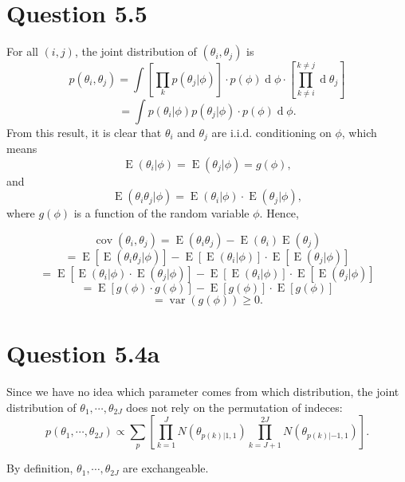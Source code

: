 \documentclass{article}
\DeclareMathOperator*{\var}{var}
\DeclareMathOperator*{\cov}{cov}
\DeclareMathOperator*{\expec}{E}
\DeclareMathOperator*{\deriv}{d}
\begin{document}
\section*{Question 5.5}
{
    For all $(i, j)$, the joint distribution of $(\theta_i, \theta_j)$ is
    $$p(\theta_i, \theta_j) = \int { \left[ \prod_{k} p(\theta_j | \phi) \right] \cdot p(\phi) \deriv{\phi} \cdot \left[ \prod_{k \neq i}^{k \neq j} {\deriv \theta_j} \right] }$$
    $$= \int { p(\theta_i | \phi) p(\theta_j | \phi) \cdot p(\phi) \deriv{\phi} }.$$
    From this result, it is clear that $\theta_i$ and $\theta_j$ are i.i.d. conditioning on $\phi$, which means 
    $$\expec{(\theta_i | \phi)} = \expec{(\theta_j | \phi)} = g(\phi),$$ 
    and $$\expec{(\theta_i \theta_j | \phi)} = \expec{(\theta_i | \phi)} \cdot \expec{(\theta_j | \phi)},$$ 
    where $g(\phi)$ is a function of the random variable $\phi$. Hence,

    $$\cov{(\theta_i, \theta_j)} = \expec{(\theta_i \theta_j)} - \expec{(\theta_i)} \expec{(\theta_j)}$$
    $$= \expec{\left[\expec{(\theta_i \theta_j | \phi)}\right]} - \expec{\left[\expec{(\theta_i | \phi)}\right]} \cdot \expec{\left[\expec{(\theta_j | \phi)} \right]}$$
    $$= \expec{\left[ \expec{(\theta_i | \phi)} \cdot \expec{(\theta_j | \phi)} \right]} - \expec{\left[\expec{(\theta_i | \phi)}\right]} \cdot \expec{\left[\expec{(\theta_j | \phi)} \right]}$$
    $$= \expec{\left[ g(\phi) \cdot g(\phi) \right]} - \expec{\left[ g(\phi) \right]} \cdot \expec{\left[ g(\phi) \right]}$$
    $$= \var{(g(\phi))} \geq 0.$$
    
    
}

\section*{Question 5.4a}
{
    Since we have no idea which parameter comes from which distribution, the joint distribution of $\theta_1, \cdots, \theta_{2J}$ does not rely on the permutation of indeces:
    $$p(\theta_1, \cdots, \theta_{2J}) \propto \sum_{p} { \left[ \prod_{k=1}^{J} {N(\theta_{p(k) | 1, 1})} \prod_{k=J+1}^{2J} {N(\theta_{p(k) | -1, 1})} \right] }.$$

    By definition, $\theta_1, \cdots, \theta_{2J}$ are exchangeable.
}
\end{document}
